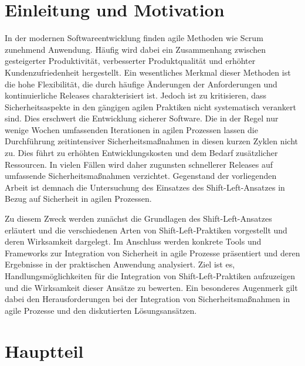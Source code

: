 \documentclass[acmtog]{acmart}
\begin{document}
\maketitle

\section{Einleitung und Motivation}

In der modernen Softwareentwicklung finden agile Methoden wie Scrum zunehmend Anwendung.
Häufig wird dabei ein Zusammenhang zwischen gesteigerter Produktivität, verbesserter Produktqualität und erhöhter Kundenzufriedenheit hergestellt. 
Ein wesentliches Merkmal dieser Methoden ist die hohe Flexibilität, die durch häufige Änderungen der Anforderungen und kontinuierliche Releases charakterisiert ist.
Jedoch ist zu kritisieren, dass Sicherheitsaspekte in den gängigen agilen Praktiken nicht systematisch verankert sind. \cite{nagele_current_2023} Dies erschwert die Entwicklung sicherer Software. \cite{oueslati_literature_2015}
Die in der Regel nur wenige Wochen umfassenden Iterationen in agilen Prozessen lassen die Durchführung zeitintensiver Sicherheitsmaßnahmen in diesen kurzen Zyklen nicht zu. 
Dies führt zu erhöhten Entwicklungskosten und dem Bedarf zusätzlicher Ressourcen. In vielen Fällen wird daher zugunsten schnellerer Releases auf umfassende Sicherheitsmaßnahmen verzichtet. \cite{oueslati_literature_2015} 
Gegenstand der vorliegenden Arbeit ist demnach die Untersuchung des Einsatzes des Shift-Left-Ansatzes in Bezug auf Sicherheit in agilen Prozessen.

Zu diesem Zweck werden zunächst die Grundlagen des Shift-Left-Ansatzes erläutert und die verschiedenen Arten von Shift-Left-Praktiken vorgestellt und deren Wirksamkeit dargelegt.
Im Anschluss werden konkrete Tools und Frameworks zur Integration von Sicherheit in agile Prozesse präsentiert und deren Ergebnisse in der praktischen Anwendung analysiert.
Ziel ist es, Handlungsmöglichkeiten für die Integration von Shift-Left-Praktiken aufzuzeigen und die Wirksamkeit dieser Ansätze zu bewerten. 
Ein besonderes Augenmerk gilt dabei den Herausforderungen bei der Integration von Sicherheitsmaßnahmen in agile Prozesse und den diskutierten Lösungsansätzen.



\section{Hauptteil}
\end{document}
